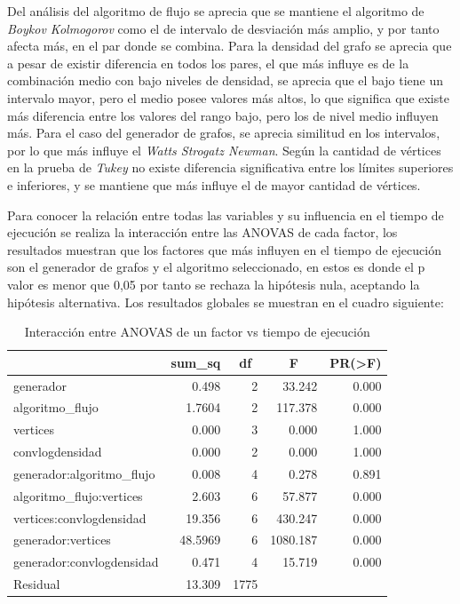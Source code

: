 \documentclass{article}
\begin{document}
Del análisis del algoritmo de flujo se aprecia que se mantiene el algoritmo de \textit{Boykov Kolmogorov} 
como el de intervalo de desviación más amplio, y por tanto afecta más, en el par donde se combina. Para la densidad del grafo se aprecia que a pesar de existir diferencia en todos los pares, el que más influye es de la combinación medio con bajo niveles de densidad, se aprecia que el bajo tiene un intervalo mayor, pero el medio posee valores más altos, lo que significa que existe más diferencia entre los valores del rango bajo, pero los de nivel medio influyen más. Para el caso del generador de grafos, se aprecia similitud en los intervalos, por lo que más influye el \textit{Watts Strogatz Newman}. Según la cantidad de vértices en la prueba de \textit{Tukey} no existe diferencia significativa entre los límites superiores e inferiores, y se mantiene que más influye el de mayor cantidad de vértices.

Para conocer la relación entre todas las variables y su influencia en el tiempo de ejecución se realiza la interacción entre las ANOVAS de cada factor, los resultados muestran que los factores que más influyen en el tiempo de ejecución son el generador de grafos y el algoritmo seleccionado, en estos es donde el p\- valor es menor que 0,05 por tanto se rechaza la hipótesis nula, aceptando la hipótesis alternativa. Los resultados globales se muestran en el cuadro siguiente:



\begin{table}[htbp]
  \centering
  \caption{Interacción entre ANOVAS de un factor vs tiempo de ejecución}
    \begin{tabular}{lrrrr}
    \toprule
          & \multicolumn{1}{c}{\textbf{sum\_sq}} & \multicolumn{1}{c}{\textbf{df}} & \multicolumn{1}{c}{\textbf{F}} & \multicolumn{1}{c}{\textbf{PR(>F)}} \\
    \midrule
    generador & 0.498 & 2     & 33.242 & 0.000\\
    algoritmo\_flujo & 1.7604 & 2     & 117.378 & 0.000 \\
    vertices & 0.000 & 3     & 0.000 & 1.000 \\
    convlogdensidad & 0.000 & 2     & 0.000 & 1.000 \\
    generador:algoritmo\_flujo & 0.008 & 4     & 0.278 & 0.891 \\
    algoritmo\_flujo:vertices & 2.603 & 6     & 57.877 & 0.000 \\
    vertices:convlogdensidad & 19.356 & 6     & 430.247 & 0.000 \\
    generador:vertices & 48.5969 & 6     & 1080.187 & 0.000 \\
    generador:convlogdensidad & 0.471 & 4     & 15.719 & 0.000 \\
    Residual & 13.309 & 1775  &       &  \\
    \bottomrule
    \end{tabular}%
  \label{tab:addlabel}%
\end{table}%
\end{document}
